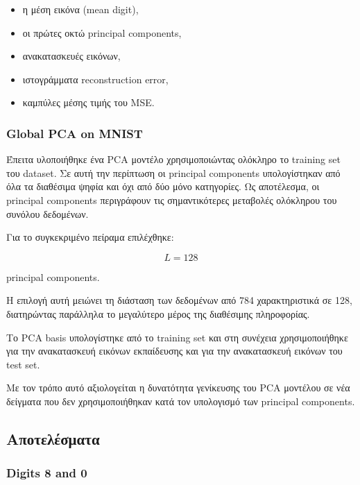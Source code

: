 \documentclass[12pt]{article}
\begin{document}
\begin{itemize}
\item η μέση εικόνα (mean digit),
\item οι πρώτες οκτώ principal components,
\item ανακατασκευές εικόνων,
\item ιστογράμματα reconstruction error,
\item καμπύλες μέσης τιμής του MSE.
\end{itemize}

\subsubsection{Global PCA on MNIST}
Έπειτα υλοποιήθηκε ένα PCA μοντέλο χρησιμοποιώντας ολόκληρο το training set του dataset. Σε αυτή την περίπτωση οι principal components υπολογίστηκαν 
από όλα τα διαθέσιμα ψηφία και όχι από δύο μόνο κατηγορίες. Ως αποτέλεσμα, οι principal components περιγράφουν τις σημαντικότερες μεταβολές ολόκληρου 
του συνόλου δεδομένων.

Για το συγκεκριμένο πείραμα επιλέχθηκε:

\[
L = 128
\]

principal components.

Η επιλογή αυτή μειώνει τη διάσταση των δεδομένων από 784 χαρακτηριστικά σε 128, διατηρώντας παράλληλα το μεγαλύτερο μέρος της διαθέσιμης πληροφορίας.

Το PCA basis υπολογίστηκε από το training set και στη συνέχεια χρησιμοποιήθηκε για την ανακατασκευή εικόνων εκπαίδευσης και για την ανακατασκευή εικόνων 
του test set.

Με τον τρόπο αυτό αξιολογείται η δυνατότητα γενίκευσης του PCA μοντέλου σε νέα δείγματα που δεν χρησιμοποιήθηκαν κατά τον υπολογισμό των principal 
components.

\subsection{Αποτελέσματα}

\subsubsection{Digits 8 and 0}
\end{document}
